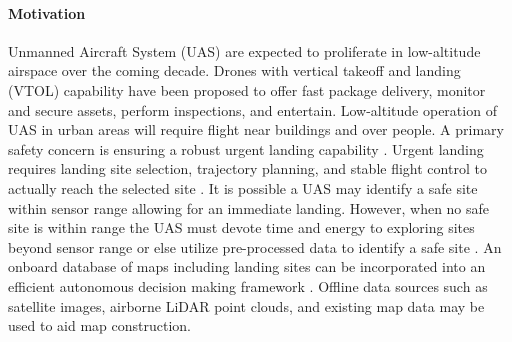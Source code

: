 
\paragraph{Motivation}

Unmanned Aircraft System (UAS) are expected to proliferate in low-altitude airspace over the coming decade. Drones with vertical takeoff and landing (VTOL) capability have been proposed to offer fast package delivery, monitor and secure assets, perform inspections, and entertain.
Low-altitude operation of UAS in urban areas will require flight near buildings and over people. 
A primary safety concern is ensuring a robust urgent landing capability \cite{winnefeld_unmanned_2011,degarmo_issues_2013}.  Urgent landing requires landing site selection, trajectory planning, and stable flight control to actually reach the selected site \cite{atkins_emergency_2006}. It is possible a UAS may identify a safe site within sensor range allowing for an immediate landing.  However, when no safe site is within range the UAS must devote time and energy to exploring sites beyond sensor range or else utilize pre-processed data to identify a safe site \cite{ten_harmsel_emergency_2017,ochoa_fail-safe_2017}.  An onboard database of maps including landing sites can be incorporated into an efficient autonomous decision making framework \cite{sankararaman_towards_2017}. Offline data sources such as satellite images, airborne LiDAR point clouds, and existing map data may be used to aid map construction.

